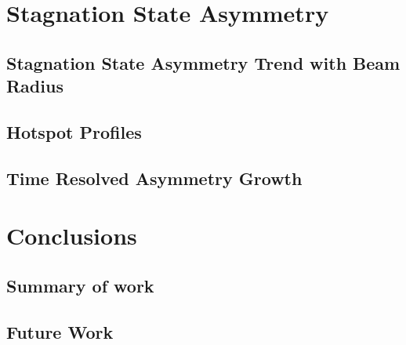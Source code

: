 \section{Stagnation State Asymmetry}%
\label{sec:Res1_StagnationAsymm}


\subsection{Stagnation State Asymmetry Trend with Beam Radius}%
\label{sec:Res1_stagnation_asymm_trend}


\subsection{Hotspot Profiles}%
\label{sec:Res1_HS_profiles}


\subsection{Time Resolved Asymmetry Growth}%
\label{sec:Res1_time_res_growth}


\section{Conclusions}%
\label{sec:Res1_Conclusions}


\subsection{Summary of work}%
\label{sec:Res1_Summary}


\subsection{Future Work}%
\label{sec:Res1_future}